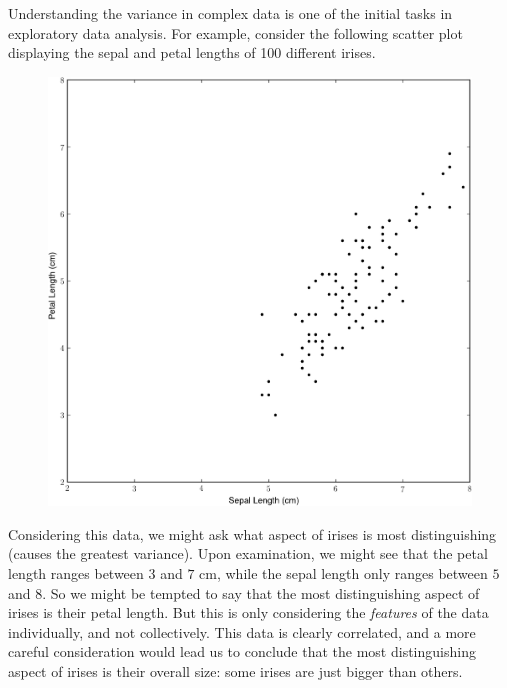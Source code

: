 
Understanding the variance in complex data is one of the initial tasks in exploratory data analysis. For example, consider the following scatter plot displaying the sepal and petal lengths of 100 different irises.
\begin{figure}
\includegraphics[width=\textwidth]{iris0.pdf}
\end{figure}
Considering this data, we might ask what aspect of irises is most distinguishing (causes the greatest variance). Upon examination, we might see that the petal length ranges between $3$ and $7$ cm, while the sepal length only ranges between $5$ and $8$. So we might be tempted to say that the most distinguishing aspect of irises is their petal length.
But this is only considering the \emph{features} of the data individually, and not collectively. This data is clearly correlated, and a more careful consideration would lead us to conclude that the most distinguishing aspect of irises is their overall size: some irises are just bigger than others.
